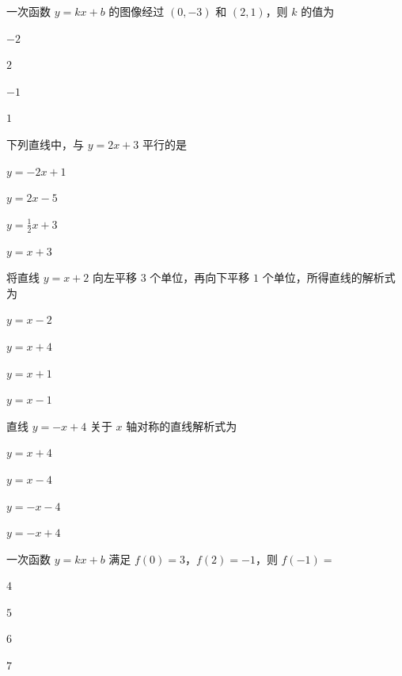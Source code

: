 \documentclass{exam-zh}
\begin{document}
\begin{question}[points=5]
  一次函数 $y = kx + b$ 的图像经过 $(0, -3)$ 和 $(2, 1)$，则 $k$ 的值为
  \begin{choices}
    \item $-2$
    \item $2$
    \item $-1$
    \item $1$
  \end{choices}
\end{question}



\begin{question}[points=5]
  下列直线中，与 $y = 2x + 3$ 平行的是
  \begin{choices}
    \item $y = -2x + 1$
    \item $y = 2x - 5$
    \item $y = \frac{1}{2}x + 3$
    \item $y = x + 3$
  \end{choices}
\end{question}



\begin{question}[points=5]
  将直线 $y = x + 2$ 向左平移 $3$ 个单位，再向下平移 $1$ 个单位，所得直线的解析式为
  \begin{choices}
    \item $y = x - 2$
    \item $y = x + 4$
    \item $y = x + 1$
    \item $y = x - 1$
  \end{choices}
\end{question}



\begin{question}[points=5]
  直线 $y = -x + 4$ 关于 $x$ 轴对称的直线解析式为
  \begin{choices}
    \item $y = x + 4$
    \item $y = x - 4$
    \item $y = -x - 4$
    \item $y = -x + 4$
  \end{choices}
\end{question}



\begin{question}[points=5]
  一次函数 $y = kx + b$ 满足 $f(0) = 3$，$f(2) = -1$，则 $f(-1) = $
  \begin{choices}
    \item $4$
    \item $5$
    \item $6$
    \item $7$
  \end{choices}
\end{question}
\end{document}
